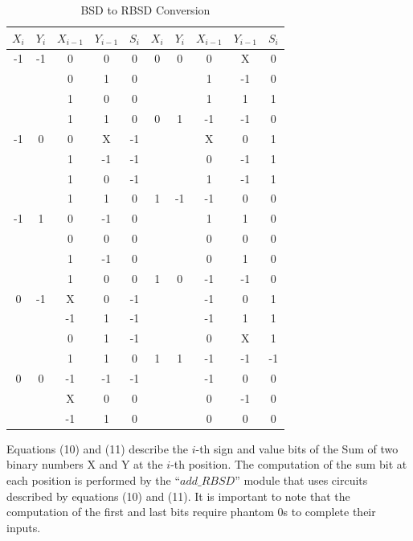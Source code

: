 \documentclass[conference]{IEEEtran}
\begin{document}
\setlength{\tabcolsep}{0.4em}
\begin{table}[h!]
  \centering
  \caption{BSD to RBSD Conversion}
  \label{tab:table4}
  \begin{tabular}{|c|c|c|c||c|||c|c|c|c||c|}
    \hline
    $X_{i}$ & $Y_{i}$ & $X_{i-1}$ & $Y_{i-1}$ & $S_{i}$  &  $X_{i}$ & $Y_{i}$ & $X_{i-1}$ & $Y_{i-1}$ & $S_{i}$ \\
    \hline
    \hline
    -1 & -1 & 0 & 0 & 0  &  0 & 0 & 0 & X & 0 \\
    \hline
    & & 0 & 1 & 0  &  & & 1 & -1 & 0 \\
    \hline
    & & 1 & 0 & 0  &  & & 1 & 1 & 1 \\
    \hline
    & & 1 & 1 & 0  &  0 & 1 & -1 & -1 & 0 \\
    \hline
    -1 & 0 & 0 & X & -1  &  & & X & 0 & 1 \\
    \hline
    & & 1 & -1 & -1  &  & & 0 & -1 & 1 \\
    \hline
    & & 1 & 0 & -1  &  & & 1 & -1 & 1 \\
    \hline
    & & 1 & 1 & 0  &  1 & -1 & -1 & 0 & 0 \\
    \hline
    -1 & 1 & 0 & -1 & 0  &  & & 1 & 1 & 0 \\
    \hline
    & & 0 & 0 & 0  &  & & 0 & 0 & 0 \\
    \hline
    & & 1 & -1 & 0 &  & & 0 & 1 & 0 \\
    \hline
    & & 1 & 0 & 0  &  1 & 0 & -1 & -1 & 0 \\
    \hline
    0 & -1 & X & 0 & -1  &  & & -1 & 0 & 1 \\
    \hline
    & & -1 & 1 & -1  &  & & -1 & 1 & 1 \\
    \hline
    & & 0 & 1 & -1  &  & & 0 & X & 1 \\
    \hline
    & & 1 & 1 & 0  &  1 & 1 & -1 & -1 & -1 \\
    \hline
    0 & 0 & -1 & -1 & -1  &  & & -1 & 0 & 0 \\
    \hline
    & & X & 0 & 0  &  & & 0 & -1 & 0 \\
    \hline
    & & -1 & 1 & 0  &  & & 0 & 0 & 0 \\
    \hline
  \end{tabular}
\end{table}

Equations (10) and (11) describe the $i$-th sign and value bits of the Sum of two binary numbers X and Y at the $i$-th position. The computation of the sum bit at each position is performed by the ``$add\_RBSD$'' module that uses circuits described by equations (10) and (11). It is important to note that the computation of the first and last bits require phantom 0s to complete their inputs.
\end{document}
